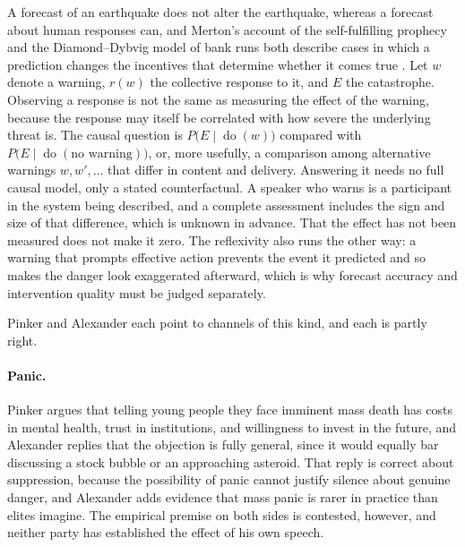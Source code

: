 \documentclass[11pt]{article}
\begin{document}
A forecast of an earthquake does not alter the earthquake, whereas a forecast about human responses can, and Merton's account of the self-fulfilling prophecy and the Diamond--Dybvig model of bank runs both describe cases in which a prediction changes the incentives that determine whether it comes true \cite{merton1948,diamond1983}. Let $w$ denote a warning, $r(w)$ the collective response to it, and $E$ the catastrophe. Observing a response is not the same as measuring the effect of the warning, because the response may itself be correlated with how severe the underlying threat is. The causal question is $P\bigl(E \mid \operatorname{do}(w)\bigr)$ compared with $P\bigl(E \mid \operatorname{do}(\text{no warning})\bigr)$, or, more usefully, a comparison among alternative warnings $w, w', \dots$ that differ in content and delivery. Answering it needs no full causal model, only a stated counterfactual. A speaker who warns is a participant in the system being described, and a complete assessment includes the sign and size of that difference, which is unknown in advance. That the effect has not been measured does not make it zero. The reflexivity also runs the other way: a warning that prompts effective action prevents the event it predicted and so makes the danger look exaggerated afterward, which is why forecast accuracy and intervention quality must be judged separately.

Pinker and Alexander each point to channels of this kind, and each is partly right.

\paragraph{Panic.} Pinker argues that telling young people they face imminent mass death has costs in mental health, trust in institutions, and willingness to invest in the future, and Alexander replies that the objection is fully general, since it would equally bar discussing a stock bubble or an approaching asteroid. That reply is correct about suppression, because the possibility of panic cannot justify silence about genuine danger, and Alexander adds evidence that mass panic is rarer in practice than elites imagine. The empirical premise on both sides is contested, however, and neither party has established the effect of his own speech.
\end{document}
